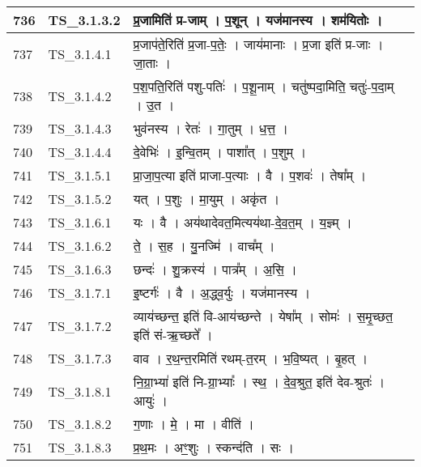 \documentclass[17pt]{extarticle}
\begin{document}
\begin{longtable}{||p{0.4in}||p{0.9in}||p{4.0in}||p{0.9in}||}
            736 & TS\_3.1.3.2 & प्र॒जामिति॑ प्र{-}जाम्   ।   प॒शून्   ।   यज॑मानस्य   ।   शम॑यितोः   ।    &      \\
        \hline
            737 & TS\_3.1.4.1 & प्र॒जाप॑ते॒रिति॑ प्र॒जा{-}प॒तेः॒   ।   जाय॑मानाः   ।   प्र॒जा इति॑ प्र{-}जाः   ।   जा॒ताः   ।    &      \\
        \hline
            738 & TS\_3.1.4.2 & प॒श॒पति॒रिति॑ पशु{-}पतिः॑   ।   प॒शू॒नाम्   ।   चतु॑ष्पदा॒मिति॒ चतुः॑{-}प॒दा॒म्   ।   उ॒त   ।    &      \\
        \hline
            739 & TS\_3.1.4.3 & भुव॑नस्य   ।   रेतः॑   ।   गा॒तुम्   ।   ध॒त्त॒   ।    &      \\
        \hline
            740 & TS\_3.1.4.4 & दे॒वेभिः॑   ।   इ॒न्वि॒तम्   ।   पाशा᳚त्   ।   प॒शुम्   ।    &      \\
        \hline
            741 & TS\_3.1.5.1 & प्रा॒जा॒प॒त्या इति॑ प्राजा{-}प॒त्याः   ।   वै   ।   प॒शवः॑   ।   तेषा᳚म्   ।    &      \\
        \hline
            742 & TS\_3.1.5.2 & यत्   ।   प॒शुः   ।   मा॒युम्   ।   अकृ॑त   ।    &      \\
        \hline
            743 & TS\_3.1.6.1 & यः   ।   वै   ।   अय॑थादेवत॒मित्यय॑था{-}दे॒व॒त॒म्   ।   य॒ज्ञ्म्   ।    &      \\
        \hline
            744 & TS\_3.1.6.2 & ते॒   ।   स॒ह   ।   यु॒नज्मि॑   ।   वाच᳚म्   ।    &      \\
        \hline
            745 & TS\_3.1.6.3 & छन्दः॑   ।   शु॒क्रस्य॑   ।   पात्र᳚म्   ।   अ॒सि॒   ।    &      \\
        \hline
            746 & TS\_3.1.7.1 & इ॒ष्टर्गः॑   ।   वै   ।   अ॒द्ध्व॒र्युः   ।   यज॑मानस्य   ।    &      \\
        \hline
            747 & TS\_3.1.7.2 & व्याय॑च्छन्त॒ इति॑ वि{-}आय॑च्छन्ते   ।   येषा᳚म्   ।   सोमः॑   ।   स॒मृ॒च्छत॒ इति॑ सं{-}ऋ॒च्छते᳚   ।    &      \\
        \hline
            748 & TS\_3.1.7.3 & वाव   ।   र॒थ॒न्त॒रमिति॑ रथम्{-}त॒रम्   ।   भ॒वि॒ष्यत्   ।   बृ॒हत्   ।    &      \\
        \hline
            749 & TS\_3.1.8.1 & नि॒ग्रा॒भ्या॑ इति॑ नि{-}ग्रा॒भ्याः᳚   ।   स्थ॒   ।   दे॒व॒श्रुत॒ इति॑ देव{-}श्रुतः॑   ।   आयुः॑   ।    &      \\
        \hline
            750 & TS\_3.1.8.2 & ग॒णाः   ।   मे॒   ।   मा   ।   वीति॑   ।    &      \\
        \hline
            751 & TS\_3.1.8.3 & प्र॒थ॒मः   ।   अꣳ॒॒शुः   ।   स्कन्द॑ति   ।   सः   ।    &      \\

\end{longtable}
\end{document}
